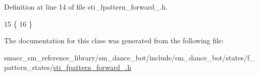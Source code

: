 Definition at line 14 of file sti\+\_\+fpattern\+\_\+forward\+\_.\+h.


\begin{DoxyCode}
15   \{
16   \}
\end{DoxyCode}


The documentation for this class was generated from the following file\+:\begin{DoxyCompactItemize}
\item 
smacc\+\_\+sm\+\_\+reference\+\_\+library/sm\+\_\+dance\+\_\+bot/include/sm\+\_\+dance\+\_\+bot/states/f\+\_\+pattern\+\_\+states/\hyperlink{include_2sm__dance__bot_2states_2f__pattern__states_2sti__fpattern__forward__2_8h}{sti\+\_\+fpattern\+\_\+forward\+\_.\+h}\end{DoxyCompactItemize}
